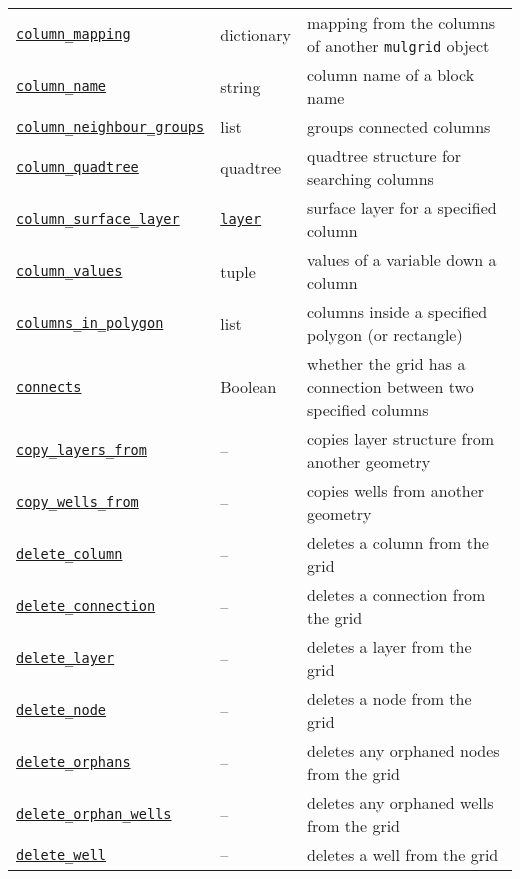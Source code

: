 \begin{center}
\begin{longtable}{|l|l|p{70mm}|}
  \hyperref[sec:mulgrid:column_mapping]{\texttt{column\_mapping}} & dictionary & mapping from the columns of another \texttt{mulgrid} object\\
  \hyperref[sec:mulgrid:column_name]{\texttt{column\_name}} & string & column name of a block name\\ 
  \hyperref[sec:mulgrid:column_neighbour_groups]{\texttt{column\_neighbour\_groups}} & list & groups connected columns\\ 
  \hyperref[sec:mulgrid:column_quadtree]{\texttt{column\_quadtree}} & quadtree & quadtree structure for searching columns\\ 
  \hyperref[sec:mulgrid:column_surface_layer]{\texttt{column\_surface\_layer}} & \hyperref[layerobjects]{\texttt{layer}} & surface layer for a specified column\\
  \hyperref[sec:mulgrid:column_values]{\texttt{column\_values}} & tuple & values of a variable down a column\\
  \hyperref[sec:mulgrid:columns_in_polygon]{\texttt{columns\_in\_polygon}} & list & columns inside a specified polygon (or rectangle)\\ 
  \hyperref[sec:mulgrid:connects]{\texttt{connects}} & Boolean & whether the grid has a connection between two specified columns\\ 
  \hyperref[sec:mulgrid:copy_layers_from]{\texttt{copy\_layers\_from}} & -- & copies layer structure from another geometry\\ 
  \hyperref[sec:mulgrid:copy_wells_from]{\texttt{copy\_wells\_from}} & -- & copies wells from another geometry\\ 
  \hyperref[sec:mulgrid:delete_column]{\texttt{delete\_column}} & -- & deletes a column from the grid\\ 
  \hyperref[sec:mulgrid:delete_connection]{\texttt{delete\_connection}} & -- & deletes a connection from the grid\\ 
  \hyperref[sec:mulgrid:delete_layer]{\texttt{delete\_layer}} & -- & deletes a layer from the grid\\ 
  \hyperref[sec:mulgrid:delete_node]{\texttt{delete\_node}} & -- & deletes a node from the grid\\ 
  \hyperref[sec:mulgrid:delete_orphans]{\texttt{delete\_orphans}} & -- & deletes any orphaned nodes from the grid\\ 
  \hyperref[sec:mulgrid:delete_orphan_wells]{\texttt{delete\_orphan\_wells}} & -- & deletes any orphaned wells from the grid\\ 
  \hyperref[sec:mulgrid:delete_well]{\texttt{delete\_well}} & -- & deletes a well from the grid\\ 

\end{longtable}
\end{center}
